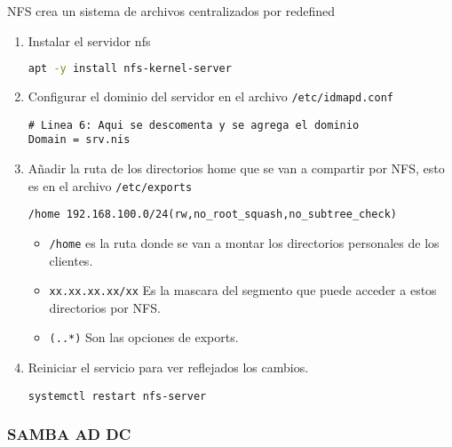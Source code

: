 \documentclass[../main.tex]{subfiles}
\begin{document}
NFS crea un sistema de archivos centralizados por redefined
\begin{enumerate}
\item Instalar el servidor nfs

  \begin{lstlisting}[language=bash]
apt -y install nfs-kernel-server
\end{lstlisting}

\item Configurar el dominio del servidor en el
  archivo \lstinline|/etc/idmapd.conf|

  \begin{lstlisting}[label={list:idmapd},  caption=Modificación del archivo /etc/idmap.conf]
# Linea 6: Aqui se descomenta y se agrega el dominio
Domain = srv.nis
\end{lstlisting}

\item Añadir la ruta de los directorios home que se van a
  compartir por NFS, esto es en el archivo \lstinline|/etc/exports|

  \begin{lstlisting}[label={list:exports},caption=Adición en el archivo /etc/exports]
/home 192.168.100.0/24(rw,no_root_squash,no_subtree_check) 
\end{lstlisting}

  \begin{itemize}
  \item \lstinline|/home| es la ruta donde se van a montar
    los directorios personales de los clientes.
  \item \lstinline|xx.xx.xx.xx/xx| Es la mascara del segmento que
    puede acceder a estos directorios por NFS.\@
  \item \lstinline|(..*)| Son las opciones de exports.
  \end{itemize}

  
\item Reiniciar el servicio para ver reflejados los cambios.

  \begin{lstlisting}
systemctl restart nfs-server
\end{lstlisting}
  
\end{enumerate}

\subsubsection{SAMBA AD DC}\label{sec:samba_addc}
\end{document}
